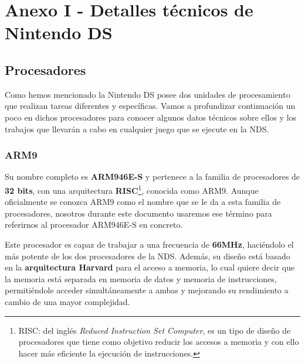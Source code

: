 
\chapter{Anexo I - Detalles técnicos de Nintendo DS}
\label{anexo}

\section{Procesadores}

Como hemos mencionado la Nintendo DS posee dos unidades de procesamiento que realizan tareas diferentes y específicas. Vamos a profundizar continuación un poco en dichos procesadores para conocer algunos datos técnicos sobre ellos y los trabajos que llevarán a cabo en cualquier juego que se ejecute en la NDS.

\vspace{1cm}

\subsection{ARM9}

Su nombre completo es \textbf{ARM946E-S} y pertenece a la familia de procesadores de \textbf{32 bits}, con una arquitectura \textbf{RISC}\footnote{RISC: del inglés \textit{Reduced Instruction Set Computer}, es un tipo de diseño de procesadores que tiene como objetivo reducir los accesos a memoria y con ello hacer más eficiente la ejecución de instrucciones.}, conocida como ARM9. Aunque oficialmente se conozca ARM9 como el nombre que se le da a esta familia de procesadores, nosotros durante este documento usaremos ese término para referirnos al procesador ARM946E-S en concreto.

\vspace{0.5cm}

Este procesador es capaz de trabajar a una frecuencia de \textbf{66MHz}, haciéndolo el más potente de los dos procesadores de la NDS. Además, su diseño está basado en la \textbf{arquitectura Harvard} para el acceso a memoria, lo cual quiere decir que la memoria está separada en memoria de datos y memoria de instrucciones, permitiéndole acceder simultáneamente a ambas y mejorando su rendimiento a cambio de una mayor complejidad.

